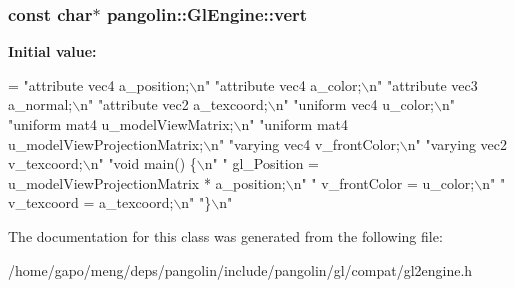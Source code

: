 \subsubsection[{\texorpdfstring{vert}{vert}}]{\setlength{\rightskip}{0pt plus 5cm}const char$\ast$ pangolin\+::\+Gl\+Engine\+::vert}\hypertarget{classpangolin_1_1_gl_engine_a506421bbd51fc480ee4ea202f40c5c23}{}\label{classpangolin_1_1_gl_engine_a506421bbd51fc480ee4ea202f40c5c23}
{\bfseries Initial value\+:}
\begin{DoxyCode}
=
            \textcolor{stringliteral}{"attribute vec4 a\_position;\(\backslash\)n"}
            \textcolor{stringliteral}{"attribute vec4 a\_color;\(\backslash\)n"}
            \textcolor{stringliteral}{"attribute vec3 a\_normal;\(\backslash\)n"}
            \textcolor{stringliteral}{"attribute vec2 a\_texcoord;\(\backslash\)n"}
            \textcolor{stringliteral}{"uniform vec4 u\_color;\(\backslash\)n"}
            \textcolor{stringliteral}{"uniform mat4 u\_modelViewMatrix;\(\backslash\)n"}
            \textcolor{stringliteral}{"uniform mat4 u\_modelViewProjectionMatrix;\(\backslash\)n"}
            \textcolor{stringliteral}{"varying vec4 v\_frontColor;\(\backslash\)n"}
            \textcolor{stringliteral}{"varying vec2 v\_texcoord;\(\backslash\)n"}
            \textcolor{stringliteral}{"void main() \{\(\backslash\)n"}
            \textcolor{stringliteral}{"    gl\_Position = u\_modelViewProjectionMatrix * a\_position;\(\backslash\)n"}
            \textcolor{stringliteral}{"    v\_frontColor = u\_color;\(\backslash\)n"}
            \textcolor{stringliteral}{"    v\_texcoord = a\_texcoord;\(\backslash\)n"}
            \textcolor{stringliteral}{"\}\(\backslash\)n"}
\end{DoxyCode}


The documentation for this class was generated from the following file\+:\begin{DoxyCompactItemize}
\item 
/home/gapo/meng/deps/pangolin/include/pangolin/gl/compat/gl2engine.\+h\end{DoxyCompactItemize}
